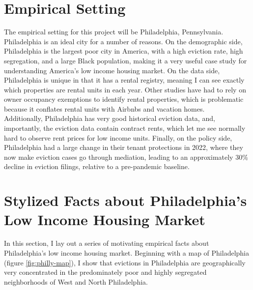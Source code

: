\documentclass{article}
\begin{document}


\section{Empirical Setting}

The empirical setting for this project will be Philadelphia, Pennsylvania. Philadelphia is an ideal city for a number of reasons. On the demographic side, Philadelphia is the largest poor city in America, with a high eviction rate, high segregation, and a large Black population, making it a very useful case study for understanding America's low income housing market. On the data side, Philadelphia is unique in that it has a rental registry, meaning I can see exactly which properties are rental units in each year. Other studies have had to rely on owner occupancy exemptions to identify rental properties, which is problematic because it conflates rental units with Airbnbs and vacation homes. \\

Additionally, Philadelphia has very good historical eviction data, and, importantly, the eviction data contain contract rents, which let me see normally hard to observe rent prices for low income units. Finally, on the policy side, Philadelphia had a large change in their tenant protections in 2022, where they now make eviction cases go through mediation, leading to an approximately 30\% decline in eviction filings, relative to a pre-pandemic baseline.

\section{Stylized Facts about Philadelphia's Low Income Housing Market}

In this section, I lay out a series of motivating empirical facts about Philadelphia's low income housing market. Beginning with a map of Philadelphia (figure \ref{fig:philly-map}), I show that evictions in Philadelphia are geographically very concentrated in the predominately poor and highly segregated neighborhoods of West and North Philadelphia.
\end{document}
